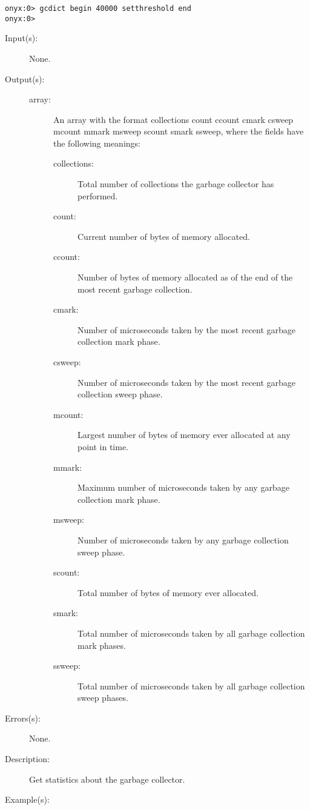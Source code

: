 \begin{description}
\begin{description}
\begin{verbatim}
onyx:0> gcdict begin 40000 setthreshold end
onyx:0>
		\end{verbatim}
	\end{description}
\label{gcdict:stats}
\item[{\onyxop{--}{stats}{array}}: ]
	\begin{description}\item[]
	\item[Input(s): ] None.
	\item[Output(s): ]
		\begin{description}\item[]
		\item[array: ]
			An array with the format {\lb}collections count
			{\lb}ccount cmark csweep{\rb} {\lb}mcount mmark
			msweep{\rb} {\lb}scount smark ssweep{\rb}{\rb}, where
			the fields have the following meanings:
			\begin{description}\item[]
			\item[collections: ]
				Total number of collections the garbage
				collector has performed.
			\item[count: ]
				Current number of bytes of memory allocated.
			\item[ccount: ]
				Number of bytes of memory allocated as of the
				end of the most recent garbage collection.
			\item[cmark: ]
				Number of microseconds taken by the most recent
				garbage collection mark phase.
			\item[csweep: ]
				Number of microseconds taken by the most recent
				garbage collection sweep phase.
			\item[mcount: ]
				Largest number of bytes of memory ever allocated
				at any point in time.
			\item[mmark: ]
				Maximum number of microseconds taken by any
				garbage collection mark phase.
			\item[msweep: ]
				Number of microseconds taken by any garbage
				collection sweep phase.
			\item[scount: ]
				Total number of bytes of memory ever allocated.
			\item[smark: ]
				Total number of microseconds taken by all
				garbage collection mark phases.
			\item[ssweep: ]
				Total number of microseconds taken by all
				garbage collection sweep phases.
			\end{description}
		\end{description}
	\item[Errors(s): ] None.
	\item[Description: ]
		Get statistics about the garbage collector.
	\item[Example(s): ]\begin{verbatim}


\end{verbatim}
\end{description}
\end{description}
